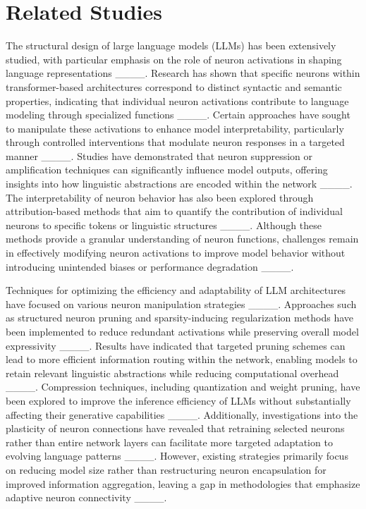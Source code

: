 \section{Related Studies}
The structural design of large language models (LLMs) has been extensively studied, with particular emphasis on the role of neuron activations in shaping language representations ____. Research has shown that specific neurons within transformer-based architectures correspond to distinct syntactic and semantic properties, indicating that individual neuron activations contribute to language modeling through specialized functions ____. Certain approaches have sought to manipulate these activations to enhance model interpretability, particularly through controlled interventions that modulate neuron responses in a targeted manner ____. Studies have demonstrated that neuron suppression or amplification techniques can significantly influence model outputs, offering insights into how linguistic abstractions are encoded within the network ____. The interpretability of neuron behavior has also been explored through attribution-based methods that aim to quantify the contribution of individual neurons to specific tokens or linguistic structures ____. Although these methods provide a granular understanding of neuron functions, challenges remain in effectively modifying neuron activations to improve model behavior without introducing unintended biases or performance degradation ____. 

Techniques for optimizing the efficiency and adaptability of LLM architectures have focused on various neuron manipulation strategies ____. Approaches such as structured neuron pruning and sparsity-inducing regularization methods have been implemented to reduce redundant activations while preserving overall model expressivity ____. Results have indicated that targeted pruning schemes can lead to more efficient information routing within the network, enabling models to retain relevant linguistic abstractions while reducing computational overhead ____. Compression techniques, including quantization and weight pruning, have been explored to improve the inference efficiency of LLMs without substantially affecting their generative capabilities ____. Additionally, investigations into the plasticity of neuron connections have revealed that retraining selected neurons rather than entire network layers can facilitate more targeted adaptation to evolving language patterns ____. However, existing strategies primarily focus on reducing model size rather than restructuring neuron encapsulation for improved information aggregation, leaving a gap in methodologies that emphasize adaptive neuron connectivity ____. 

